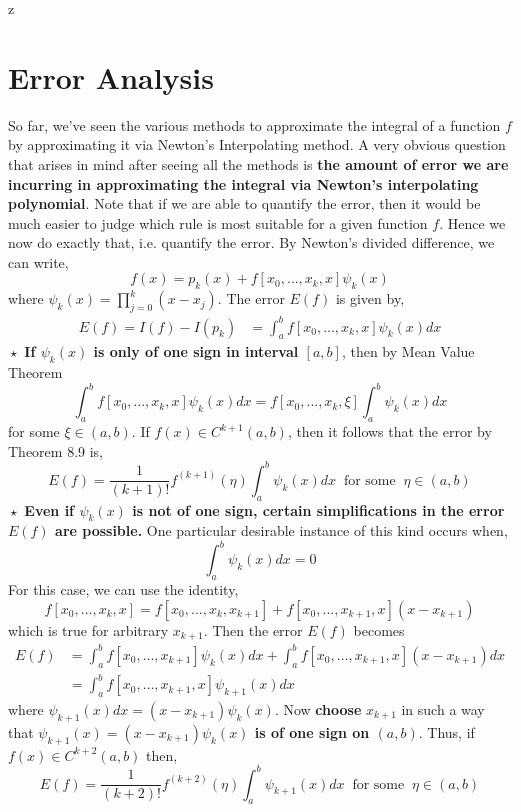 z\documentclass[a4paper,12pt,twoside]{book}
\newcommand{\nll}[0]{\newline\newline}
\begin{document}
\section{Error Analysis}
So far, we've seen the various methods to approximate the integral of a function $f$ by approximating it via Newton's Interpolating method. A very obvious question that arises in mind after seeing all the methods is \textbf{the amount of error we are incurring in approximating the integral via Newton's interpolating polynomial}. Note that if we are able to quantify the error, then it would be much easier to judge which rule is most suitable for a given function $f$. Hence we now do exactly that, i.e. quantify the error.
\nll
By Newton's divided difference, we can write,
\[ f(x) = p_k(x) + f[x_0,\dots,x_k,x]\psi_k(x) \]
where $\psi_k(x) = \prod_{j=0}^k(x-x_j)$. The error $E(f)$ is given by,
\begin{equation*}
    \begin{split}
        E(f) = I(f) - I(p_k) &= \int_a^b f[x_0,\dots,x_k,x]\psi_k(x) dx
    \end{split}
\end{equation*}
$\boxed{\star}$ \textbf{If $\psi_k(x)$ is only of one sign in interval $[a,b]$}, then by Mean Value Theorem
\[ \int_a^b f[x_0,\dots,x_k,x] \psi_k(x) dx = f[x_0,\dots,x_k,\xi] \int_a^b \psi_k(x)dx \]
for some $\xi \in (a,b)$. If $f(x) \in C^{k+1}(a,b)$, then it follows that the error by Theorem 8.9 is,
\begin{equation}
    \boxed{E(f) = \frac{1}{(k+1)!} f^{(k+1)}(\eta) \int_a^b\psi_k(x)dx \;\;\text{for some}\;\;\eta \in(a,b)}
\end{equation}
$\boxed{\star}$ \textbf{Even if $\psi_k(x)$ is not of one sign, certain simplifications in the error $E(f)$ are possible.} One particular desirable instance of this kind occurs when,
\begin{equation}
    \int_a^b \psi_k(x)dx = 0
\end{equation}
For this case, we can use the identity,
\begin{equation}
    f[x_0,\dots,x_k,x] = f[x_0,\dots,x_k,x_{k+1}] + f[x_0,\dots,x_{k+1},x](x-x_{k+1})
\end{equation}
which is true for arbitrary $x_{k+1}$. Then the error $E(f)$ becomes
\begin{equation}
    \begin{split}
        E(f) &= \int_a^bf[x_0,\dots,x_{k+1}]\psi_k(x)dx + \int_a^b f[x_0,\dots,x_{k+1},x](x-x_{k+1})dx\\
        &= \int_a^b f[x_0,\dots,x_{k+1},x] \psi_{k+1}(x)dx
    \end{split}
\end{equation}
where $\psi_{k+1}(x)dx = (x-x_{k+1})\psi_k(x)$.
\nll
Now \textbf{choose} $x_{k+1}$ in such a way that \textbf{$\psi_{k+1}(x)= (x-x_{k+1})\psi_k(x)$ is of one sign on $(a,b)$}. Thus, if $f(x) \in C^{k+2}(a,b)$ then,
\begin{equation}
    \boxed{E(f) = \frac{1}{(k+2)!} f^{(k+2)}(\eta)\int_a^b\psi_{k+1}(x)dx\;\;\text{for some}\;\; \eta \in (a,b)}
\end{equation}
\end{document}
